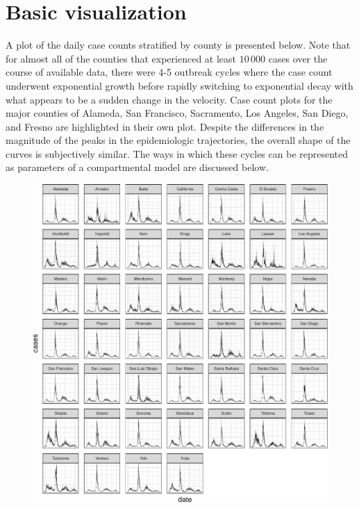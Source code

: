 \documentclass[
  11pt,
  letterpaper,
  DIV=11,
  numbers=noendperiod]{scrartcl}
\begin{document}
\hypertarget{basic-visualization}{%
\section{Basic visualization}\label{basic-visualization}}

A plot of the daily case counts stratified by county is presented below.
Note that for almost all of the counties that experienced at least
\(10\,000\) cases over the course of available data, there were 4-5
outbreak cycles where the case count underwent exponential growth before
rapidly switching to exponential decay with what appears to be a sudden
change in the velocity. Case count plots for the major counties of
Alameda, San Francisco, Sacramento, Los Angeles, San Diego, and Fresno
are highlighted in their own plot. Despite the differences in the
magnitude of the peaks in the epidemiologic trajectories, the overall
shape of the curves is subjectively similar. The ways in which these
cycles can be represented as parameters of a compartmental model are
discussed below.

\begin{figure}

{\centering \includegraphics{progress_files/figure-pdf/unnamed-chunk-2-1.pdf}

}

\end{figure}
\end{document}
